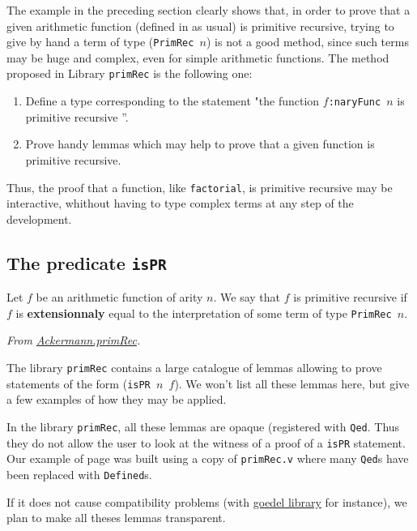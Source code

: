 The example in the preceding section clearly shows that, in order to prove that a given arithmetic function
(defined in \gallina{} as usual) is primitive recursive, trying to give  by hand a term  of type (\texttt{PrimRec $n$}) is not a good method, since such terms may be huge and complex, even for simple arithmetic functions. The method proposed in Library \texttt{primRec} is the following one:

\begin{enumerate}
\item Define a type corresponding to the statement "the function \texttt{$f$:naryFunc $n$} is primitive recursive ''.
\item Prove handy lemmas which may help to prove that a given function is primitive recursive.
\end{enumerate}

Thus, the proof that a function, like \texttt{factorial}, is primitive recursive may be interactive, whithout having to type complex terms at any step of the development.

\subsection{The predicate \texttt{isPR}}


Let $f$ be an arithmetic function of arity $n$. We say that $f$ is primitive recursive if $f$ is \textbf{extensionnaly}
equal to the interpretation of some term of type \texttt{PrimRec $n$}. 

\vspace{4pt}
\noindent
\emph{From \href{../theories/html/hydras.Ackermann.primRec.html}{Ackermann.primRec}.}



The library \texttt{primRec} contains a large catalogue of lemmas allowing to prove statements 
of the form (\texttt{isPR $n$ $f$}). We won't list all these lemmas here, but give a few examples of
how they may be applied.

\begin{remark}
In the library \texttt{primRec}, all these lemmas are opaque (registered with \texttt{Qed}. Thus they do not allow the user to look at the witness of a proof of a \texttt{isPR} statement. Our example of page\pageref{sect:bigfac} was built using a  copy of \texttt{primRec.v} where many \texttt{Qed}s have been replaced with
\texttt{Defined}s.

If it does not cause compatibility problems (with 
\href{https://github.com/coq-community/goedel}{goedel library} for instance), we plan to make all theses lemmas transparent.
\end{remark}

